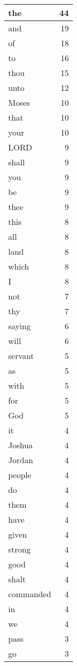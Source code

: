 \begin{center}
\begin{longtable}{l|r}
\hline \hline
\endlastfoot
the & 44 \\ \hline
and & 19 \\ \hline
of & 18 \\ \hline
to & 16 \\ \hline
thou & 15 \\ \hline
unto & 12 \\ \hline
Moses & 10 \\ \hline
that & 10 \\ \hline
your & 10 \\ \hline
LORD & 9 \\ \hline
shall & 9 \\ \hline
you & 9 \\ \hline
be & 9 \\ \hline
thee & 9 \\ \hline
this & 8 \\ \hline
all & 8 \\ \hline
land & 8 \\ \hline
which & 8 \\ \hline
I & 8 \\ \hline
not & 7 \\ \hline
thy & 7 \\ \hline
saying & 6 \\ \hline
will & 6 \\ \hline
servant & 5 \\ \hline
as & 5 \\ \hline
with & 5 \\ \hline
for & 5 \\ \hline
God & 5 \\ \hline
it & 4 \\ \hline
Joshua & 4 \\ \hline
Jordan & 4 \\ \hline
people & 4 \\ \hline
do & 4 \\ \hline
them & 4 \\ \hline
have & 4 \\ \hline
given & 4 \\ \hline
strong & 4 \\ \hline
good & 4 \\ \hline
shalt & 4 \\ \hline
commanded & 4 \\ \hline
in & 4 \\ \hline
we & 4 \\ \hline
pass & 3 \\ \hline
go & 3 \\ \hline

\end{longtable}
\end{center}
